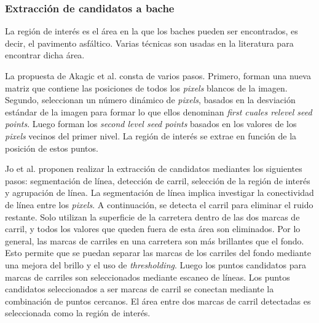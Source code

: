 		\subsubsection{Extracción de candidatos a bache}
		La región de interés es el área en la que los baches pueden ser encontrados, es decir, el pavimento asfáltico.
		Varias técnicas son usadas en la literatura para encontrar dicha área. 

		La propuesta de Akagic et al. consta de varios pasos. Primero, forman una nueva matriz que contiene las posiciones 
		de todos los \emph{pixels} blancos de la imagen. Segundo, seleccionan un número dinámico de \emph{pixels}, basados 
		en la desviación estándar de la imagen para formar lo que ellos denominan \emph{first cuales relevel seed points}. Luego forman  los 
		\emph{second level seed points} basados en los valores de los \emph{pixels} vecinos del primer nivel. La región de
		interés se extrae en función de la posición de estos puntos.
		

		Jo et al. proponen realizar la extracción de candidatos mediantes los siguientes pasos: segmentación de línea, 
		detección de carril, selección de la región de interés y agrupación de línea. La segmentación de línea implica investigar la conectividad 
		de línea entre los \emph{pixels}. A continuación, se detecta el carril para eliminar el ruido restante. Solo utilizan la superficie de la 
		carretera dentro de las dos marcas de carril, y todos los valores que queden fuera de esta área son eliminados. Por lo general, las marcas 
		de carriles en una carretera son más brillantes que el fondo. Esto permite que  se puedan separar las marcas de los carriles del fondo mediante 
		una  mejora del brillo y el uso de \emph{thresholding}. Luego los puntos candidatos para marcas de carriles son seleccionados mediante escaneo de 
		líneas. Los puntos candidatos seleccionados a ser marcas de carril se conectan mediante la combinación de puntos cercanos. El área entre 
		dos marcas de carril detectadas es seleccionada como la región de interés. 

